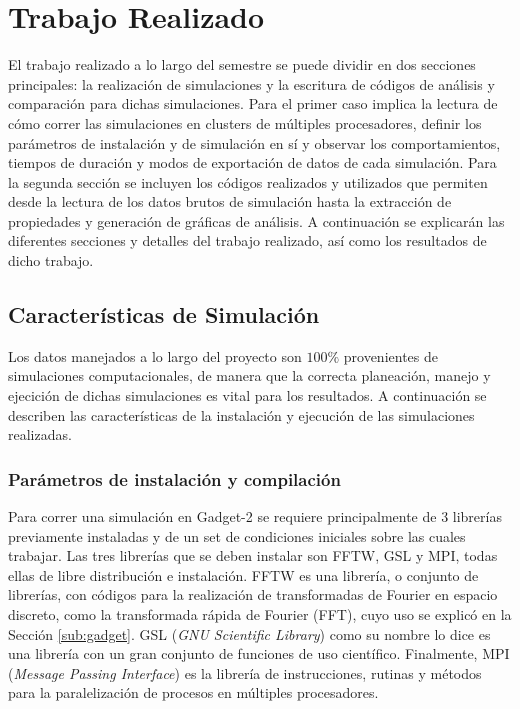 \chapter{Trabajo Realizado}
\label{chap:trabajo}
El trabajo realizado a lo largo del semestre se puede dividir en dos secciones principales: la realización de simulaciones y la escritura de códigos de análisis y comparación para dichas simulaciones. Para el primer caso implica la lectura de cómo correr las simulaciones en clusters de múltiples procesadores, definir los parámetros de instalación y de simulación en sí y observar los comportamientos, tiempos de duración y modos de exportación de datos de cada simulación. Para la segunda sección se incluyen los códigos realizados y utilizados que permiten desde la lectura de los datos brutos de simulación hasta la extracción de propiedades y generación de gráficas de análisis. A continuación se explicarán las diferentes secciones y detalles del trabajo realizado, así como los resultados de dicho trabajo.

\section{Características de Simulación}
Los datos manejados a lo largo del proyecto son $100\%$ provenientes de simulaciones computacionales, de manera que la correcta planeación, manejo y ejecición de dichas simulaciones es vital para los resultados. A continuación se describen las características de la instalación y ejecución de las simulaciones realizadas.

\subsection{Parámetros de instalación y compilación}
Para correr una simulación en Gadget-2 se requiere principalmente de 3 librerías previamente instaladas y de un set de condiciones iniciales sobre las cuales trabajar. Las tres librerías que se deben instalar son FFTW, GSL y MPI, todas ellas de libre distribución e instalación. FFTW es una librería, o conjunto de librerías, con códigos para la realización de transformadas de Fourier en espacio discreto, como la transformada rápida de Fourier (FFT), cuyo uso se explicó en la Sección \ref{sub:gadget}. GSL (\textit{GNU Scientific Library}) como su nombre lo dice es una librería con un gran conjunto de funciones de uso científico. Finalmente, MPI (\textit{Message Passing Interface}) es la librería de instrucciones, rutinas y métodos para la paralelización de procesos en múltiples procesadores. 

